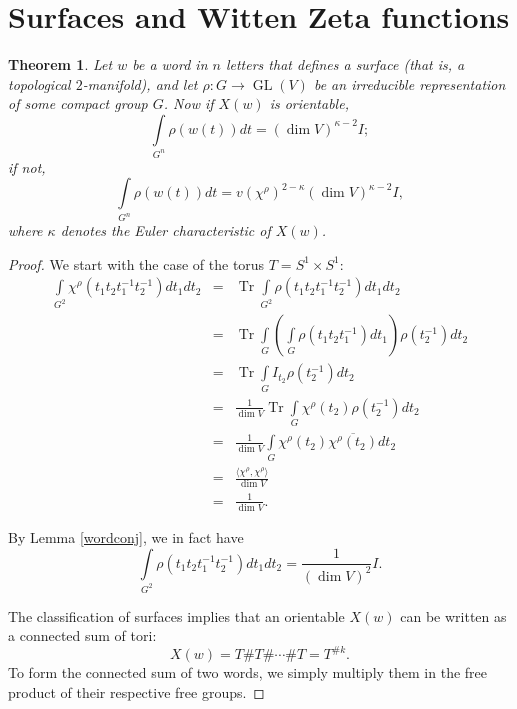 \documentclass[12pt]{article}
\newtheorem{thm}{Theorem}[section]
\newcommand{\be}{\begin{equation}}
\newcommand{\ee}{\end{equation}}
\newcommand{\bea}{\begin{eqnarray}}
\newcommand{\eea}{\end{eqnarray}}
\newcommand{\nn}{\nonumber}
\DeclareMathOperator{\GL}{GL}
\DeclareMathOperator{\Tr}{Tr}
\begin{document}
\section{Surfaces and Witten Zeta functions}
\begin{thm}\label{surfaceintegrals}
Let $w$ be a word in $n$ letters that defines a surface (that is, a topological $2$-manifold), and let $\rho : G \to \GL(V)$ be an irreducible representation of some compact group $G$.  Now if $X(w)$ is orientable,
\be \int \limits_{G^n} \rho (w(t)) dt = (\dim V)^{\kappa - 2}I; \ee
if not,
\be \int \limits_{G^n} \rho (w(t)) dt = v(\chi^\rho)^{2 - \kappa} (\dim V)^{\kappa - 2}I, \ee
where $\kappa$ denotes the Euler characteristic of $X(w)$.
\end{thm}
\begin{proof}
We start with the case of the torus $T=S^1 \times S^1$:
\bea
\int \limits_{G^2} \chi^{\rho} (t_1 t_2 t_1^{-1} t_2^{-1}) dt_1 dt_2 & = & \Tr \int \limits_{G^2} \rho (t_1 t_2 t_1^{-1} t_2^{-1}) dt_1 dt_2 \nn\\
 & = & \Tr \int \limits_{G} \left( \int \limits_{G} \rho (t_1 t_2 t_1^{-1}) dt_1 \right) \rho(t_2^{-1}) dt_2 \nn\\
 & = & \Tr \int \limits_{G} I_{t_2} \rho(t_2^{-1}) dt_2 \nn\\
 & = & \frac{1}{\dim V} \Tr \int \limits_{G} \chi^{\rho}(t_2) \rho(t_2^{-1}) dt_2 \nn\\
 & = & \frac{1}{\dim V} \int \limits_{G} \chi^{\rho}(t_2) \overline{\chi^{\rho}(t_2)} dt_2 \nn\\
 & = & \frac{\langle \chi^{\rho}, \chi^{\rho} \rangle}{\dim V} \nn\\
 & = & \frac{1}{\dim V}.
\eea

By Lemma \ref{wordconj}, we in fact have
\be \int \limits_{G^2} \rho (t_1 t_2 t_1^{-1} t_2^{-1}) dt_1 dt_2 = \frac{1}{(\dim V)^2}I. \ee


The classification of surfaces implies that an orientable $X(w)$ can be written as a connected sum of tori:
\be X(w) = T \# T \# \cdots \# T = T^{\# k}. \ee
To form the connected sum of two words, we simply multiply them in the free product of their respective free groups.


\end{proof}
\end{document}
